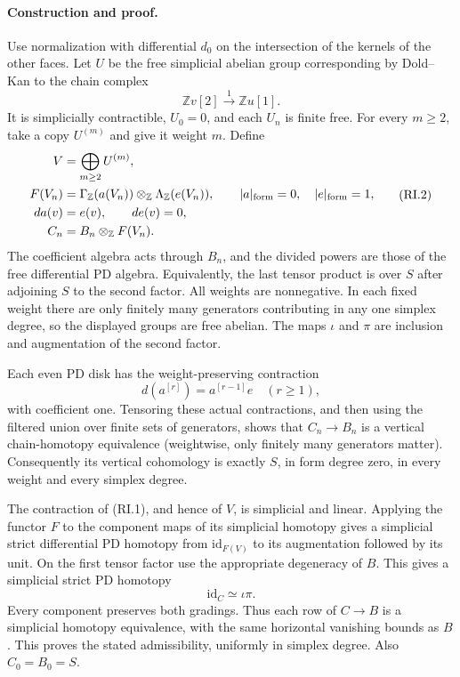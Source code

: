 \paragraph{Construction and proof.}
Use normalization with differential \(d_0\) on the intersection
of the kernels of the other faces. Let \(U\) be the free simplicial
abelian group corresponding by Dold--Kan to the chain complex
\[
                \mathbb Z v[2]\xrightarrow{\ 1\ }
                \mathbb Z u[1].                         \tag{RI.1}
\]
It is simplicially contractible, \(U_0=0\), and each \(U_n\)
is finite free. For every \(m\geq2\), take a copy \(U^{(m)}\)
and give it weight \(m\). Define
\[
 \begin{split}
  V&=\bigoplus_{m\geq2}U^{(m)},\\
  F(V_n)&=\Gamma_{\mathbb Z}(a(V_n))
                      \otimes_{\mathbb Z}\Lambda_{\mathbb Z}(e(V_n)),
       \qquad |a|_{\rm form}=0,\quad |e|_{\rm form}=1,\\
  da(v)&=e(v),\qquad de(v)=0,\\
  C_n&=B_n\otimes_{\mathbb Z}F(V_n).
 \end{split}                                               \tag{RI.2}
\]
The coefficient algebra acts through \(B_n\), and the
divided powers are those of the free differential PD algebra.
Equivalently, the last tensor product is over \(S\) after
adjoining \(S\) to the second factor. All weights are nonnegative.
In each fixed weight there are only finitely many generators
contributing in any one simplex degree, so the displayed groups
are free abelian. The maps \(\iota\) and \(\pi\) are inclusion
and augmentation of the second factor.

Each even PD disk has the weight-preserving contraction
\[
 d(a^{[r]})=a^{[r-1]}e\quad(r\geq1),
\]
with coefficient one. Tensoring these actual contractions, and
then using the filtered union over finite sets of generators,
shows that \(C_n\to B_n\) is a vertical chain-homotopy
equivalence (weightwise, only finitely many generators matter).
Consequently its vertical cohomology is exactly \(S\), in
form degree zero, in every weight and every simplex degree.

The contraction of (RI.1), and hence of \(V\), is simplicial
and linear. Applying the functor \(F\) to the component maps
of its simplicial homotopy gives a simplicial strict differential
PD homotopy from \(\mathrm{id}_{F(V)}\) to its augmentation
followed by its unit. On the first tensor factor use the
appropriate degeneracy of \(B\). This gives a simplicial
strict PD homotopy
\[
                       \mathrm{id}_C\simeq\iota\pi .       \tag{RI.3}
\]
Every component preserves both gradings. Thus each row of
\(C\to B\) is a simplicial homotopy equivalence, with the same
horizontal vanishing bounds as \(B\). This proves the stated
admissibility, uniformly in simplex degree. Also \(C_0=B_0=S\).

